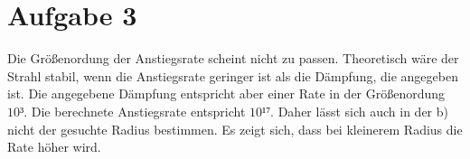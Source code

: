 \documentclass[11pt,a4paper]{article}
\begin{document}
	\section*{Aufgabe 3}

		Die Größenordung der Anstiegsrate scheint nicht zu passen. Theoretisch wäre der Strahl stabil, 
		wenn die Anstiegsrate geringer ist als die Dämpfung, die angegeben ist.
		Die angegebene Dämpfung entspricht aber einer Rate in der Größenordung $10³$.
		Die berechnete Anstiegsrate entspricht $10¹⁷$.
		Daher lässt sich auch in der b) nicht der gesuchte Radius bestimmen.
		Es zeigt sich, dass bei kleinerem Radius die Rate höher wird.
\end{document}
